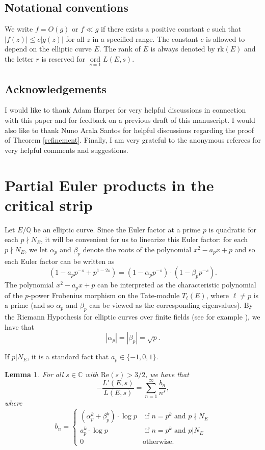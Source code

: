 \documentclass[12pt,reqno]{amsart}
\newtheorem{lemma}[theorem]{Lemma}
\theoremstyle{definition}
\numberwithin{equation}{section}
\newcommand{\rk}{\mathrm{rk}}
\newcommand{\ord}{\mathop{\mathrm{ord}}}
\renewcommand{\Re}{\mathrm{Re}}
\begin{document}
\subsection*{Notational conventions} We write $f=O(g)$ or $f \ll g$ if there exists a positive constant $c$ such that $|f(z)| \leq c |g(z)|$ for all $z$ in a specified range. The constant $c$ is allowed to depend on the elliptic curve $E$.  The rank of $E$ is always denoted by $\rk(E)$ and the letter $r$ is reserved for $\ord \limits _{s=1} L(E, s)$. 




\subsection*{Acknowledgements}
I would like to thank Adam Harper for very helpful discussions in connection with this paper and for feedback on a previous draft of this manuscript. I would also like to thank Nuno Arala Santos for helpful discussions regarding the proof of Theorem \ref{refinement}. Finally, I am very grateful to the anonymous referees for very helpful comments and suggestions. 


\section{Partial Euler products in the critical strip}
Let $E/\mathbb Q$ be an elliptic curve. 
Since the Euler factor at a prime $p$ is quadratic for each $p \nmid N_E$, it will be convenient for us to linearize this Euler factor: for each $p \nmid N_E$, we let $\alpha_p$ and $\beta_p$ denote the roots of the polynomial $x^2-a_px +p$ and so
each Euler factor can be written as 
$$
(1-a_p p^{-s}+p^{1-2s})= (1-\alpha_p p^{-s}) \cdot (1-\beta_p p^{-s}). 
$$
The polynomial  $x^2-a_px +p$ can be interpreted as the characteristic polynomial of the $p$-power Frobenius morphism on the Tate-module $T_\ell(E)$, where $\ell \neq p$ is a prime (and so $\alpha_p$ and $\beta_p$ can be viewed as the corresponding eigenvalues). 
By the Riemann Hypothesis for elliptic curves over finite fields (see for example \cite[Theorem 2.3.1]{Sil}), we have that 
\begin{equation} \label{alphabeta}
|\alpha_p|=|\beta_p|=\sqrt p. 
\end{equation}

If $p|N_E$, it is a standard fact that  $a_p \in \{-1, 0, 1\}$. 


\begin{lemma} \label{bn}
For all $s \in \mathbb C$ with $\Re(s)>3/2$, we have that 
$$
- \frac{L'(E, s)}{L(E, s)}=\sum_{n=1}^{\infty} \frac{b_n}{n^s}, 
$$
where  
\[ b_n= \begin{cases} 
      (\alpha_p^k+\beta_p^k) \cdot \log p & \textrm{ if } n=p^k \textrm{ and } p \nmid N_E \\
      a_p^{k} \cdot \log p &  \textrm{ if } n=p^k \textrm{ and } p | N_E \\
      0 & \textrm{otherwise.}
   \end{cases}
\]
\end{lemma}
\end{document}
